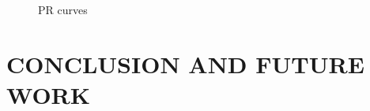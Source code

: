 \documentclass[]{spie}  %
\begin{document}
\begin{figure}[!htb]
        \hspace{-3mm}
        \caption{PR curves}
        \label{fig:pr_curves}
\end{figure}




\section{CONCLUSION AND FUTURE WORK}


\acknowledgments         


 
\end{document}
